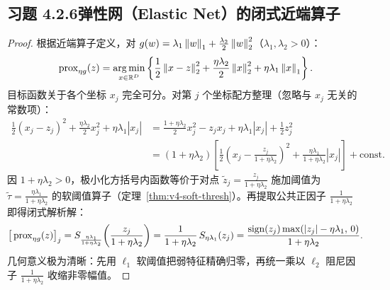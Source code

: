 \subsection*{习题 4.2.6\quad 弹性网（Elastic Net）的闭式近端算子}
\begin{proof}
根据近端算子定义，对 $g(w) = \lambda_1\left\|w\right\|_1 + \frac{\lambda_2}{2}\left\|w\right\|_2^2$（$\lambda_1, \lambda_2 > 0$）：
\[
  \operatorname{prox}_{\eta g}(z) = \operatorname*{arg\,min}_{x \in \mathbb{R}^D}\left\{\frac{1}{2}\left\|x - z\right\|_2^2 + \frac{\eta\lambda_2}{2}\left\|x\right\|_2^2 + \eta\lambda_1\left\|x\right\|_1\right\}.
\]
目标函数关于各个坐标 $x_j$ 完全可分。对第 $j$ 个坐标配方整理（忽略与 $x_j$ 无关的常数项）：
\begin{align*}
  \frac{1}{2}(x_j - z_j)^2 + \frac{\eta\lambda_2}{2}x_j^2 + \eta\lambda_1 |x_j|
  &= \frac{1 + \eta\lambda_2}{2}x_j^2 - z_j x_j + \eta\lambda_1 |x_j| + \frac{1}{2}z_j^2 \\
  &= (1 + \eta\lambda_2)\left[\frac{1}{2}\!\left(x_j - \frac{z_j}{1 + \eta\lambda_2}\right)^2 + \frac{\eta\lambda_1}{1 + \eta\lambda_2}|x_j|\right] + \text{const}.
\end{align*}
因 $1 + \eta\lambda_2 > 0$，极小化方括号内函数等价于对点 $\tilde{z}_j = \frac{z_j}{1+\eta\lambda_2}$ 施加阈值为 $\tilde{\tau} = \frac{\eta\lambda_1}{1+\eta\lambda_2}$ 的软阈值算子（定理~\ref{thm:v4-soft-thresh}）。再提取公共正因子 $\frac{1}{1+\eta\lambda_2}$ 即得闭式解析解：
\[
  \big[\operatorname{prox}_{\eta g}(z)\big]_j
  = S_{\frac{\eta\lambda_1}{1+\eta\lambda_2}}\!\left(\frac{z_j}{1+\eta\lambda_2}\right)
  = \frac{1}{1 + \eta\lambda_2}\, S_{\eta\lambda_1}(z_j)
  = \frac{\operatorname{sign}(z_j)\max(|z_j| - \eta\lambda_1,\, 0)}{1 + \eta\lambda_2}.
\]
几何意义极为清晰：先用 $\ell_1$ 软阈值把弱特征精确归零，再统一乘以 $\ell_2$ 阻尼因子 $\frac{1}{1+\eta\lambda_2}$ 收缩非零幅值。
\end{proof}

